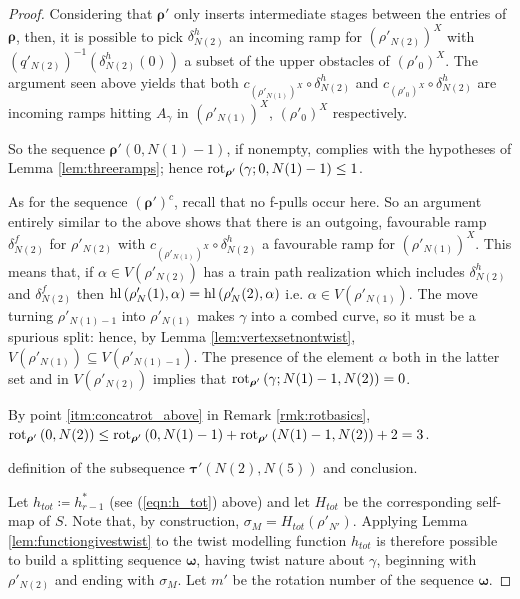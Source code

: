 \begin{proof}
Considering that $\bm\rho'$ only inserts intermediate stages between the entries of $\bm\rho$, then, it is possible to pick $\delta^h_{N(2)}$ an incoming ramp for $(\rho'_{N(2)})^X$ with $(q'_{N(2)})^{-1}\left(\delta^h_{N(2)}(0)\right)$ a subset of the upper obstacles of $(\rho'_0)^X$. The argument seen above yields that both $c_{(\rho'_{N(1)})^X}\circ\delta^h_{N(2)}$ and $c_{(\rho'_0)^X}\circ\delta^h_{N(2)}$ are incoming ramps hitting $A_\gamma$ in $(\rho'_{N(1)})^X$, $(\rho'_0)^X$ respectively.

So the sequence $\bm\rho'\left(0,N(1)-1\right)$, if nonempty, complies with the hypotheses of Lemma \ref{lem:threeramps}; hence $\mathrm{rot}_{\bm\rho'}\left(\gamma;0,N(1)-1\right)\leq 1$.

As for the sequence $(\bm\rho')^c$, recall that no f-pulls occur here. So an argument entirely similar to the above shows that there is an outgoing, favourable ramp $\delta^f_{N(2)}$ for $\rho'_{N(2)}$ with $c_{(\rho'_{N(1)})^X}\circ\delta^h_{N(2)}$ a favourable ramp for $(\rho'_{N(1)})^X$. This means that, if $\alpha\in V(\rho'_{N(2)})$ has a train path realization which includes $\delta^h_{N(2)}$ and $\delta^f_{N(2)}$ then $\mathrm{hl}\left(\rho'_N(1),\alpha\right)=\mathrm{hl}\left(\rho'_N(2),\alpha\right)$ i.e. $\alpha\in V(\rho'_{N(1)})$. The move turning $\rho'_{N(1)-1}$ into $\rho'_{N(1)}$ makes $\gamma$ into a combed curve, so it must be a spurious split: hence, by Lemma \ref{lem:vertexsetnontwist}, $V(\rho'_{N(1)})\subseteq V(\rho'_{N(1)-1})$. The presence of the element $\alpha$ both in the latter set and in $V(\rho'_{N(2)})$ implies that $\mathrm{rot}_{\bm\rho'}\left(\gamma;N(1)-1, N(2)\right)=0$.

By point \ref{itm:concatrot_above} in Remark \ref{rmk:rotbasics}, $\rot_{\bm\rho'}\left(0,N(2)\right)\leq \rot_{\bm\rho'}\left(0,N(1)-1\right)+\linebreak \rot_{\bm\rho'}\left(N(1)-1,N(2)\right)+2 =3$.

 definition of the subsequence $\bm\tau'(N(2),N(5))$ and conclusion.

Let $h_{tot}\coloneqq h^*_{r-1}$ (see (\ref{eqn:h_tot}) above) and let $H_{tot}$ be the corresponding self-map of $S$. Note that, by construction, $\sigma_M=H_{tot}(\rho'_{N'})$. Applying Lemma \ref{lem:functiongivestwist} to the twist modelling function $h_{tot}$ is therefore possible to build a splitting sequence $\bm\omega$, having twist nature about $\gamma$, beginning with $\rho'_{N(2)}$ and ending with $\sigma_M$. Let $m'$ be the rotation number of the sequence $\bm\omega$.


\end{proof}
